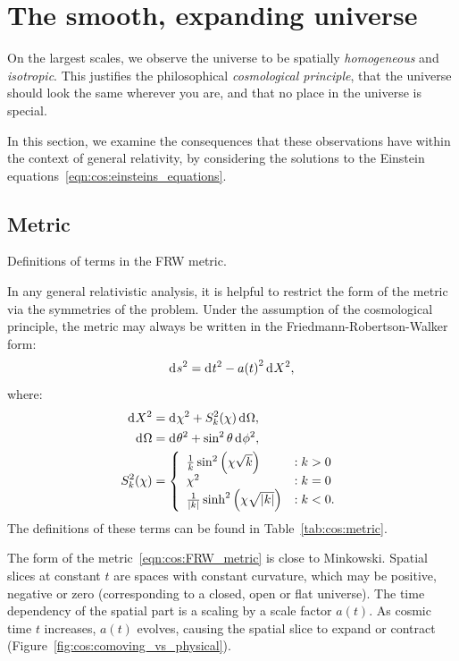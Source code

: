 \section{The smooth, expanding universe}
On the largest scales, we observe the universe to be spatially {\em homogeneous\/} and {\em isotropic}. This justifies the philosophical {\em cosmological principle}, that the universe should look the same wherever you are, and that no place in the universe is special. 

In this section, we examine the consequences that these observations have within the context of general relativity, by considering the solutions to the Einstein equations~\eqref{eqn:cos:einsteins_equations}.

\subsection{Metric}
\begin{table}[tp]
  \centering
  
\caption{Definitions of terms in the FRW metric.}\label{tab:cos:metric}
\end{table}

In any general relativistic analysis, it is helpful to restrict the form of the metric via the symmetries of the problem.
Under the assumption of the cosmological principle, the metric may always be written in the Friedmann-Robertson-Walker form:
\begin{equation}
  \operatorname{d}^{}\!{s}^2 = \operatorname{d}^{}\!{t}^2 - a{(t)}^2 \operatorname{d}^{}\!{X}^2,
  \label{eqn:cos:FRW_metric}
\end{equation}
where:
\begin{align}
  \operatorname{d}^{}\!{X}^2 &= \operatorname{d}^{}\!{\chi}^2 + S_k^2{(\chi)} \operatorname{d}^{}\!{\Omega},
  \label{eqn:cos:space_element}\\
  \operatorname{d}^{}\!{\Omega} &= \operatorname{d}^{}\!{\theta}^2 + \sin^2\theta \operatorname{d}^{}\!{\phi}^2,
  \label{eqn:cos:angle_element}\\
  S_k^2(\chi) &=
  \left\{
  \begin{array}{ll}
    \frac{1}{k}\sin^2\left(\chi\sqrt{k}\right) &: k>0 \\
    \chi^2 &: k=0 \\
    \frac{1}{|k|}\sinh^2\left(\chi\sqrt{|k|}\right) &: k<0. \\
  \end{array}
  \right.\label{eqn:cos:S_def}
\end{align}
The definitions of these terms can be found in Table~\ref{tab:cos:metric}. 

The form of the metric~\eqref{eqn:cos:FRW_metric} is close to Minkowski. Spatial slices at constant \(t\) are spaces with constant curvature, which may be positive, negative or zero (corresponding to a closed, open or flat universe). The time dependency of the spatial part is a scaling by a scale factor \(a(t)\). As cosmic time \(t\) increases, \(a(t)\) evolves, causing the spatial slice to expand or contract (Figure~\ref{fig:cos:comoving_vs_physical}). 



